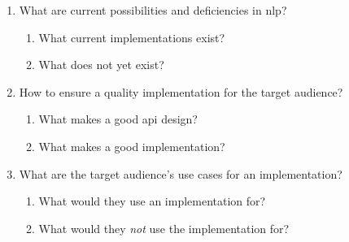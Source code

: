 \begin{enumerate}
\item
  What are current possibilities and deficiencies in \gls{nlp}?
  \begin{enumerate}
    \item What current implementations exist?
    \item What does not yet exist?
  \end{enumerate}
\item
  How to ensure a quality implementation for the target audience?
  \begin{enumerate}
    \item What makes a good \gls{api} design?
    \item What makes a good implementation?
  \end{enumerate}
\item
  What are the target audience's use cases for an implementation?
  \begin{enumerate}
    \item What would they use an implementation for?
    \item What would they \emph{not} use the implementation for?
  \end{enumerate}
\end{enumerate}

